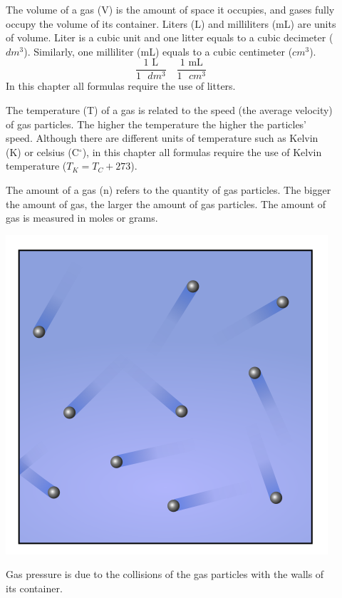 \documentclass[main.tex]{subfiles}
\begin{document}
\begin{description}
\item[] The volume of a gas (V) is the amount of space it occupies, and gases fully occupy the volume of its container. Liters (L) and milliliters (mL) are units of volume. Liter is a cubic unit and one litter equals to a cubic decimeter ($dm^3$). Similarly, one milliliter (mL) equals to a cubic centimeter ($cm^3$). 
\begin{equation*}
\boxed{   \frac{1 \text{ L} }{1\text{ }dm^3}}\quad  \boxed{ \frac{1\text{ mL}}{1\text{ }cm^3}}   
\end{equation*}
In this chapter all formulas require the use of litters.
\item[] The temperature (T) of a gas is related to the speed (the average velocity) of gas particles. The higher the temperature the higher the particles' speed. Although there are different units of temperature such as Kelvin (K) or celsius (C$^{\circ}$), in this chapter all formulas require the use of Kelvin temperature ($T_K=T_C+273$).
\item[] The amount of a gas (n) refers to the quantity of gas particles. The bigger the amount of gas, the larger the amount of gas particles. The amount of gas is measured in moles or grams.
\begin{marginfigure}[0cm]%
\includegraphics{chapter8/figure4}
\caption{Gas pressure is due to the collisions of the gas particles with the walls of its container.}
\end{marginfigure}%


\end{description}
\end{document}
